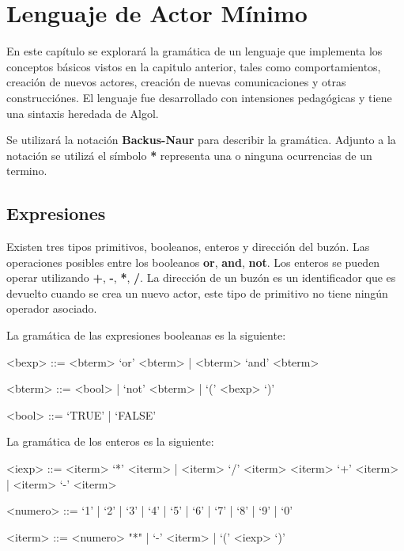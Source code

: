\chapter{Lenguaje de Actor Mínimo}

En este capítulo se explorará la gramática de un lenguaje que implementa los conceptos básicos vistos en la capitulo anterior, tales como comportamientos, creación de nuevos actores, creación de nuevas comunicaciones y otras construcciónes. El lenguaje \SAL fue desarrollado con intensiones pedagógicas y tiene una sintaxis heredada de Algol. 

Se utilizará la notación \textbf{Backus-Naur}\cite{McCracken:2003:BF:1074100.1074155} para describir la gramática. Adjunto a la notación se utilizá el símbolo \textbf{*} representa una o ninguna ocurrencias de un termino. 

\section{Expresiones}
Existen tres tipos primitivos, booleanos, enteros y dirección del buzón. Las operaciones posibles entre los booleanos \textbf{or}, \textbf{and}, \textbf{not}. Los enteros se pueden operar utilizando \textbf{+}, \textbf{-}, \textbf{*}, \textbf{/}. La dirección de un buzón es un identificador que es devuelto cuando se crea un nuevo actor, este tipo de primitivo no tiene ningún operador asociado.

La gramática de las expresiones booleanas es la siguiente:

\begin{grammar}

<bexp> ::= <bterm> `or' <bterm> | <bterm> `and' <bterm> 
  
<bterm> ::= <bool> | `not' <bterm> | `(' <bexp> `)' 

<bool> ::= `TRUE' | `FALSE'

\end{grammar}

La gramática de los enteros es la siguiente:

\begin{grammar}

<iexp> ::= <iterm> `*' <iterm> | <iterm> `/' <iterm>  
  \alt <iterm> `+' <iterm>  | <iterm> `-' <iterm>

<numero> ::= `1' | `2' | `3' | `4' | `5' | `6' | `7' | `8' | `9' | `0'

<iterm> ::= <numero> "*" | `-' <iterm> | `(' <iexp> `)'

\end{grammar}

